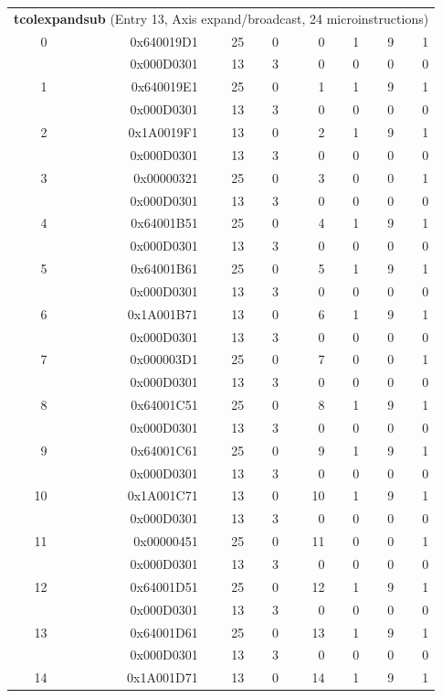 \begin{longtable}{r r r r r r r r}
\multicolumn{8}{l}{\textbf{tcolexpandsub} (Entry 13, Axis expand/broadcast, 24 microinstructions)} \\
0 & 0x640019D1 & 25 & 0 & 0 & 1 & 9 & 1 \\
  & 0x000D0301 & 13 & 3 & 0 & 0 & 0 & 0 \\
1 & 0x640019E1 & 25 & 0 & 1 & 1 & 9 & 1 \\
  & 0x000D0301 & 13 & 3 & 0 & 0 & 0 & 0 \\
2 & 0x1A0019F1 & 13 & 0 & 2 & 1 & 9 & 1 \\
  & 0x000D0301 & 13 & 3 & 0 & 0 & 0 & 0 \\
3 & 0x00000321 & 25 & 0 & 3 & 0 & 0 & 1 \\
  & 0x000D0301 & 13 & 3 & 0 & 0 & 0 & 0 \\
4 & 0x64001B51 & 25 & 0 & 4 & 1 & 9 & 1 \\
  & 0x000D0301 & 13 & 3 & 0 & 0 & 0 & 0 \\
5 & 0x64001B61 & 25 & 0 & 5 & 1 & 9 & 1 \\
  & 0x000D0301 & 13 & 3 & 0 & 0 & 0 & 0 \\
6 & 0x1A001B71 & 13 & 0 & 6 & 1 & 9 & 1 \\
  & 0x000D0301 & 13 & 3 & 0 & 0 & 0 & 0 \\
7 & 0x000003D1 & 25 & 0 & 7 & 0 & 0 & 1 \\
  & 0x000D0301 & 13 & 3 & 0 & 0 & 0 & 0 \\
8 & 0x64001C51 & 25 & 0 & 8 & 1 & 9 & 1 \\
  & 0x000D0301 & 13 & 3 & 0 & 0 & 0 & 0 \\
9 & 0x64001C61 & 25 & 0 & 9 & 1 & 9 & 1 \\
  & 0x000D0301 & 13 & 3 & 0 & 0 & 0 & 0 \\
10 & 0x1A001C71 & 13 & 0 & 10 & 1 & 9 & 1 \\
  & 0x000D0301 & 13 & 3 & 0 & 0 & 0 & 0 \\
11 & 0x00000451 & 25 & 0 & 11 & 0 & 0 & 1 \\
  & 0x000D0301 & 13 & 3 & 0 & 0 & 0 & 0 \\
12 & 0x64001D51 & 25 & 0 & 12 & 1 & 9 & 1 \\
  & 0x000D0301 & 13 & 3 & 0 & 0 & 0 & 0 \\
13 & 0x64001D61 & 25 & 0 & 13 & 1 & 9 & 1 \\
  & 0x000D0301 & 13 & 3 & 0 & 0 & 0 & 0 \\
14 & 0x1A001D71 & 13 & 0 & 14 & 1 & 9 & 1 \\

\end{longtable}
